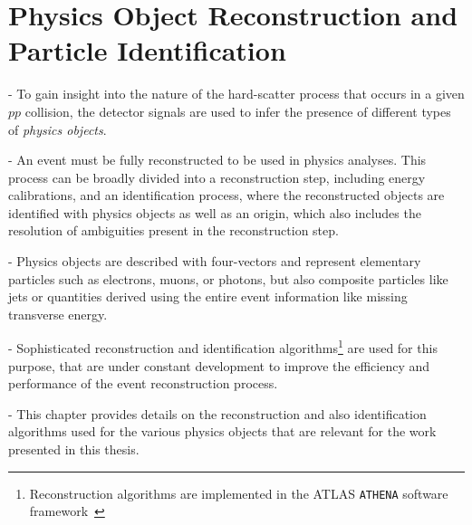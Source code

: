 
\chapter{Physics Object Reconstruction and Particle Identification}
\label{chap:objects}

- To gain insight into the nature of the hard-scatter process that occurs in a given $pp$ collision, the detector signals are used to infer the presence of different types of \emph{physics objects}. 

- An event must be fully reconstructed to be used in physics analyses. This process can be broadly divided into a reconstruction step, including energy calibrations, and an identification process, where the reconstructed objects are identified with physics objects as well as an origin, which also includes the resolution of ambiguities present in the reconstruction step.

- Physics objects are described with four-vectors and represent elementary particles such as electrons, muons, or photons, but also composite particles like jets or quantities derived using the entire event information like missing transverse energy. 

- Sophisticated reconstruction and identification algorithms\footnote{Reconstruction algorithms are implemented in the ATLAS \texttt{ATHENA} software framework~\cite{ATLAS-TDR-17}} are used for this purpose, that are under constant development to improve the efficiency and performance of the event reconstruction process. 

- This chapter provides details on the reconstruction and also identification algorithms used for the various physics objects that are relevant for the work presented in this thesis. 




